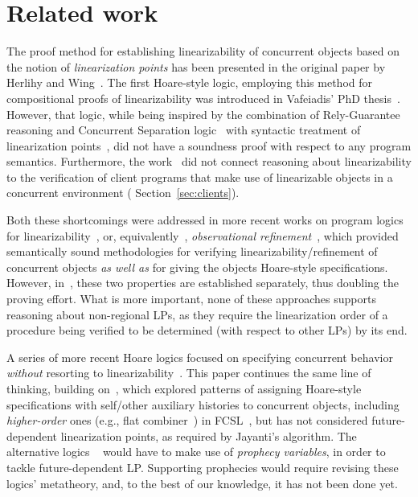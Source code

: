 \section{Related work}
\label{sc:related}


The proof method for establishing linearizability of concurrent
objects based on the notion of \emph{linearization points} has been
presented in the original paper by Herlihy and
Wing~\cite{Herlihy-Wing:TOPLAS90}. The first Hoare-style logic,
employing this method for compositional proofs of linearizability was
introduced in Vafeiadis' PhD thesis~\cite{Vafeiadis:PhD}. However,
that logic, while being inspired by the combination of Rely-Guarantee
reasoning and Concurrent Separation
logic~\cite{Vafeiadis-Parkinson:CONCUR07} with syntactic treatment of
linearization points~\cite{Vafeiadis-al:PPoPP06}, did not have a
soundness proof with respect to any program semantics. Furthermore,
the work~\cite{Vafeiadis:PhD} did not connect reasoning about
linearizability to the verification of client programs that make use
of linearizable objects in a concurrent environment (\cf
Section~\ref{sec:clients}).


Both these shortcomings were addressed in more recent works on program
logics for linearizability~\cite{Liang-Feng:PLDI13}, or,
equivalently~\cite{Filipovic-al:TCS10}, \emph{observational
  refinement}~\cite{Turon-al:ICFP13}, which provided semantically
sound methodologies for verifying linearizability/refinement of
concurrent objects \emph{as well as} for giving the objects
Hoare-style specifications.
%
However, in~\cite{Liang-Feng:PLDI13,Turon-al:ICFP13}, these two 
properties are established separately, thus doubling the proving
effort.
%
What is more important, none of these approaches supports reasoning
about non-regional LPs, as they require the linearization order of a
procedure being verified to be determined (with respect to other LPs)
by its end.
%

A series of more recent Hoare logics focused on specifying concurrent
behavior \emph{without} resorting to
linearizability~\cite{Sergey-al:ESOP15,Svendsen-Birkedal:ESOP14,ArrozPincho-al:ECOOP14,Jung-al:POPL15}.
%
This paper continues the same line of thinking, building
on~\cite{Sergey-al:ESOP15}, which explored patterns of assigning
Hoare-style specifications with self/other auxiliary histories to
concurrent objects, including \emph{higher-order} ones (e.g., {flat
  combiner}~\cite{Hendler-al:SPAA10}) in
FCSL~\cite{Nanevski-al:ESOP14}, but has not considered
future-dependent linearization points, as required by Jayanti's
algorithm.
%
The alternative logics
~\cite{ArrozPincho-al:ECOOP14,Jung-al:POPL15,Svendsen-Birkedal:ESOP14}
would have to make use of \emph{prophecy variables}, in order to
tackle future-dependent LP. Supporting prophecies would require
revising these logics' metatheory, and, to the best of our knowledge,
it has not been done yet.

